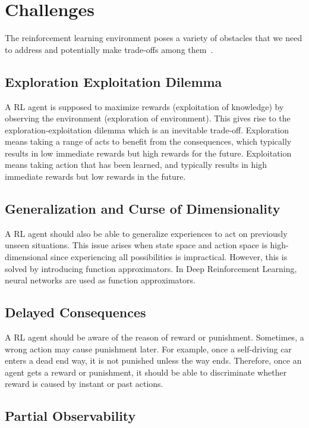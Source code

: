 \section{Challenges}
\label{sec:chal}

The reinforcement learning environment poses a variety of obstacles 
that we need to address and potentially make trade-offs among them~\cite{dulac-arnold_challenges_2019, sutton_reinforcement_1998}.

\subsection{Exploration Exploitation Dilemma}

A RL agent is supposed to maximize rewards (exploitation of knowledge) by observing the environment (exploration of environment). 
This gives rise to the exploration-exploitation dilemma which is an inevitable trade-off. 
Exploration means taking a range of acts to benefit from the consequences, which typically results in low immediate rewards but high rewards for the future. 
Exploitation means taking action that has been learned, and typically results in high immediate rewards but low rewards in the future. 

\subsection{Generalization and Curse of Dimensionality}

A RL agent should also be able to generalize experiences to act on previously unseen situations. 
This issue arises when state space and action space is high-dimensional since experiencing all possibilities is impractical. 
However, this is solved by introducing function approximators. In Deep Reinforcement Learning, neural networks are used as function approximators. 

\subsection{Delayed Consequences}

A RL agent should be aware of the reason of reward or punishment. 
Sometimes, a wrong action may cause punishment later. 
For example, once a self-driving car enters a dead end way, it is not punished unless the way ends. 
Therefore, once an agent gets a reward or punishment, it should be able to discriminate whether reward is caused by instant or past actions. 

\subsection{Partial Observability}


